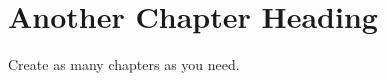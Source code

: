 \chapter{Another Chapter Heading} %
\label{cha:chapter 2 label} %
Create as many chapters as you need.
